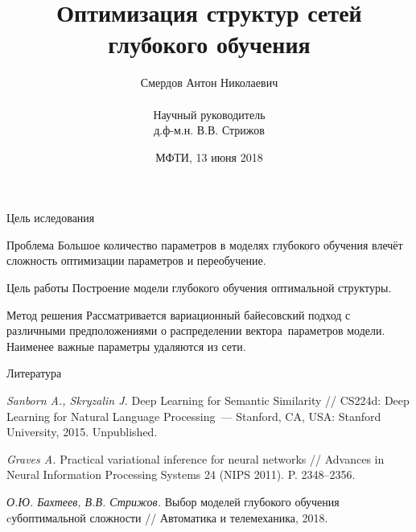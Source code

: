 \documentclass{beamer}
\title[\hbox to 56mm{Выбор оптимальной модели рекуррентной сети \ \  \hfill\insertframenumber\,/\,\inserttotalframenumber}]
{Оптимизация структур сетей глубокого обучения}
\author[А.\,Н. Смердов]{{\large Смердов Антон Николаевич\\~} {\small \\ Научный руководитель \\ д.ф-м.н. В.В. Стрижов}}
\institute[МФТИ]{Московский физико-технический институт \\
	Факультет управления и прикладной математики\\
	Кафедра <<Интеллектуальные системы>>
}
\date{\footnotesize{МФТИ, 13 июня 2018}}
\begin{document}
\begin{frame}
	\titlepage
\end{frame}

\begin{frame}{Цель иследования}

\begin{block}{Проблема}
Большое количество параметров в моделях глубокого обучения влечёт сложность оптимизации параметров и переобучение.
\end{block}

\begin{block}{Цель работы}
Построение модели глубокого обучения оптимальной структуры.
\end{block}

\begin{block}{Метод решения}
Рассматривается вариационный байесовский подход с различными предположениями о распределении вектора~параметров модели. Наименее важные параметры удаляются из сети.
\end{block}

\end{frame}
\begin{frame}{Литература}
%	
	
\begin{thebibliography}{}
	\textit{Sanborn A., Skryzalin J.} 
	Deep Learning for Semantic Similarity // CS224d: Deep Learning for Natural Language Processing~--- Stanford, CA, USA: Stanford University, 2015. Unpublished.
	
	\textit{Graves A.}
	Practical variational inference for neural networks // Advances in Neural Information Processing Systems 24 (NIPS 2011). P. 2348--2356.
	
	\textit{О.Ю. Бахтеев, В.В. Стрижов.}
	Выбор моделей глубокого обучения cубоптимальной сложности // Автоматика и телемеханика, 2018.
\end{thebibliography}{}
	
\end{frame}
\end{document}
